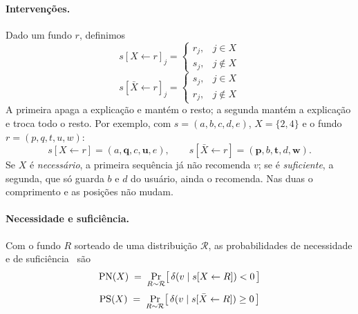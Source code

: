 \paragraph{Intervenções.}
Dado um fundo $r$, definimos
\begin{equation}
  s[X \leftarrow r]_j =
  \begin{cases} r_j, & j \in X \\ s_j, & j \notin X \end{cases}
  \label{eq:int-nec}
\end{equation}
\begin{equation}
  s[\bar X \leftarrow r]_j =
  \begin{cases} s_j, & j \in X \\ r_j, & j \notin X \end{cases}
  \label{eq:int-suf}
\end{equation}
A primeira apaga a explicação e mantém o resto; a segunda mantém a explicação
e troca todo o resto. Por exemplo, com $s=(a,b,c,d,e)$, $X=\{2,4\}$ e o fundo
$r=(p,q,t,u,w)$:
\begin{equation*}
  s[X \leftarrow r]=(a,\mathbf{q},c,\mathbf{u},e),
  \qquad
  s[\bar X \leftarrow r]=(\mathbf{p},b,\mathbf{t},d,\mathbf{w}).
\end{equation*}
Se $X$ é \emph{necessário}, a primeira sequência já não recomenda $v$; se é
\emph{suficiente}, a segunda, que só guarda $b$ e $d$ do usuário, ainda o
recomenda. Nas duas o comprimento e as posições não mudam.

\paragraph{Necessidade e suficiência.}
Com o fundo $R$ sorteado de uma distribuição $\mathcal{R}$, as probabilidades
de necessidade e de suficiência~\cite{pearl2009causality,tan2021counter} são
\begin{equation}
  \mathrm{PN}(X) \;=\; \Pr_{R \sim \mathcal{R}}\!\big[\,\delta(v \mid s[X \leftarrow R]) < 0\,\big]
  \label{eq:pn}
\end{equation}
\begin{equation}
  \mathrm{PS}(X) \;=\; \Pr_{R \sim \mathcal{R}}\!\big[\,\delta(v \mid s[\bar X \leftarrow R]) \ge 0\,\big]
  \label{eq:ps}
\end{equation}

